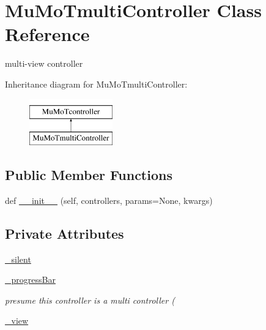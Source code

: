 \hypertarget{class_mu_mo_t_1_1_mu_mo_t_1_1_mu_mo_tmulti_controller}{}\section{Mu\+Mo\+Tmulti\+Controller Class Reference}
\label{class_mu_mo_t_1_1_mu_mo_t_1_1_mu_mo_tmulti_controller}


multi-\/view controller  


Inheritance diagram for Mu\+Mo\+Tmulti\+Controller\+:\begin{figure}[H]
\begin{center}
\leavevmode
\includegraphics[height=2.000000cm]{class_mu_mo_t_1_1_mu_mo_t_1_1_mu_mo_tmulti_controller}
\end{center}
\end{figure}
\subsection*{Public Member Functions}
\begin{DoxyCompactItemize}
\item 
def \hyperlink{class_mu_mo_t_1_1_mu_mo_t_1_1_mu_mo_tmulti_controller_afbddc21036f439ec82b1dfb498e56f04}{\+\_\+\+\_\+init\+\_\+\+\_\+} (self, controllers, params=None, kwargs)
\end{DoxyCompactItemize}
\subsection*{Private Attributes}
\begin{DoxyCompactItemize}
\item 
\hyperlink{class_mu_mo_t_1_1_mu_mo_t_1_1_mu_mo_tmulti_controller_a909146a3c119c927727c7d533042b184}{\+\_\+silent}
\item 
\hyperlink{class_mu_mo_t_1_1_mu_mo_t_1_1_mu_mo_tmulti_controller_a018864aa22d2adb0d3958fb0adbce8e2}{\+\_\+progress\+Bar}
\begin{DoxyCompactList}\small\item\em presume this controller is a multi controller ( \end{DoxyCompactList}\item 
\hyperlink{class_mu_mo_t_1_1_mu_mo_t_1_1_mu_mo_tmulti_controller_a27dd8543b5188cdfe40f622d267fe2c5}{\+\_\+view}
\end{DoxyCompactItemize}
